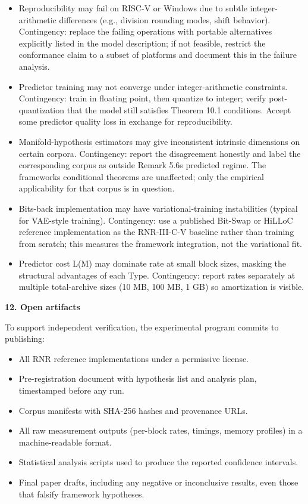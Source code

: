 \documentclass[
]{article}
\begin{document}
\begin{itemize}
\item
  Reproducibility may fail on RISC-V or Windows due to subtle
  integer-arithmetic differences (e.g., division rounding modes, shift
  behavior). Contingency: replace the failing operations with portable
  alternatives explicitly listed in the model description; if not
  feasible, restrict the conformance claim to a subset of platforms and
  document this in the failure analysis.
\item
  Predictor training may not converge under integer-arithmetic
  constraints. Contingency: train in floating point, then quantize to
  integer; verify post-quantization that the model still satisfies
  Theorem 10.1 conditions. Accept some predictor quality loss in
  exchange for reproducibility.
\item
  Manifold-hypothesis estimators may give inconsistent intrinsic
  dimensions on certain corpora. Contingency: report the disagreement
  honestly and label the corresponding corpus as outside Remark
  5.6\textquotesingle s predicted regime. The
  framework\textquotesingle s conditional theorems are unaffected; only
  the empirical applicability for that corpus is in question.
\item
  Bits-back implementation may have variational-training instabilities
  (typical for VAE-style training). Contingency: use a published
  Bit-Swap or HiLLoC reference implementation as the RNR-III-C-V
  baseline rather than training from scratch; this measures the
  framework integration, not the variational fit.
\item
  Predictor cost L(M) may dominate rate at small block sizes, masking
  the structural advantages of each Type. Contingency: report rates
  separately at multiple total-archive sizes (10 MB, 100 MB, 1 GB) so
  amortization is visible.
\end{itemize}

\textbf{12. Open artifacts}

To support independent verification, the experimental program commits to
publishing:

\begin{itemize}
\item
  All RNR reference implementations under a permissive license.
\item
  Pre-registration document with hypothesis list and analysis plan,
  timestamped before any run.
\item
  Corpus manifests with SHA-256 hashes and provenance URLs.
\item
  All raw measurement outputs (per-block rates, timings, memory
  profiles) in a machine-readable format.
\item
  Statistical analysis scripts used to produce the reported confidence
  intervals.
\item
  Final paper drafts, including any negative or inconclusive results,
  even those that falsify framework hypotheses.
\end{itemize}
\end{document}
